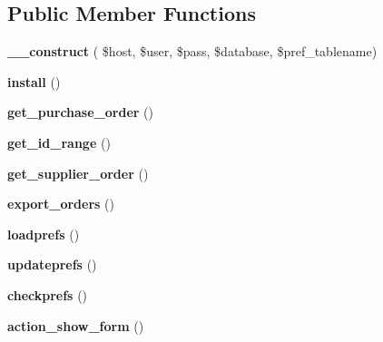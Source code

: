 \subsection*{Public Member Functions}
\begin{DoxyCompactItemize}
\item 
\hypertarget{classgeneric__orders_ad96a6adbcf3f1d2eaec7b3eefcf8cb8c}{}\label{classgeneric__orders_ad96a6adbcf3f1d2eaec7b3eefcf8cb8c} 
{\bfseries \+\_\+\+\_\+construct} ( \$host, \$user, \$pass, \$database, \$pref\+\_\+tablename)
\item 
\hypertarget{classgeneric__orders_a73da33c51344d619ad219c5c3533157a}{}\label{classgeneric__orders_a73da33c51344d619ad219c5c3533157a} 
{\bfseries install} ()
\item 
\hypertarget{classgeneric__orders_ac0a1f57dd5fe0ee9cad423a8581323b9}{}\label{classgeneric__orders_ac0a1f57dd5fe0ee9cad423a8581323b9} 
{\bfseries get\+\_\+purchase\+\_\+order} ()
\item 
\hypertarget{classgeneric__orders_a636930f29dd1a4214d9beb7b0b992fb2}{}\label{classgeneric__orders_a636930f29dd1a4214d9beb7b0b992fb2} 
{\bfseries get\+\_\+id\+\_\+range} ()
\item 
\hypertarget{classgeneric__orders_a77d76b233e40d4c76e7d93c4a2b87815}{}\label{classgeneric__orders_a77d76b233e40d4c76e7d93c4a2b87815} 
{\bfseries get\+\_\+supplier\+\_\+order} ()
\item 
\hypertarget{classgeneric__orders_afb2ea2f9acc44492b9f1880f31131df5}{}\label{classgeneric__orders_afb2ea2f9acc44492b9f1880f31131df5} 
{\bfseries export\+\_\+orders} ()
\item 
\hypertarget{classgeneric__orders_a5921f90917717297983148c16bfcdff7}{}\label{classgeneric__orders_a5921f90917717297983148c16bfcdff7} 
{\bfseries loadprefs} ()
\item 
\hypertarget{classgeneric__orders_a713ac2d657b69a5b68bcd93c085f6bff}{}\label{classgeneric__orders_a713ac2d657b69a5b68bcd93c085f6bff} 
{\bfseries updateprefs} ()
\item 
\hypertarget{classgeneric__orders_a733f9e1d53da1f2002ad5580d6215baf}{}\label{classgeneric__orders_a733f9e1d53da1f2002ad5580d6215baf} 
{\bfseries checkprefs} ()
\item 
\hypertarget{classgeneric__orders_a58246a65d39b0a1f79a520c54bf160a5}{}\label{classgeneric__orders_a58246a65d39b0a1f79a520c54bf160a5} 
{\bfseries action\+\_\+show\+\_\+form} ()
\item 
\hypertarget{classgeneric__orders_ae17ab2370a928c300c4900d1b14976d2}{}\label{classgeneric__orders_ae17ab2370a928c300c4900d1b14976d2} 

\end{DoxyCompactItemize}
